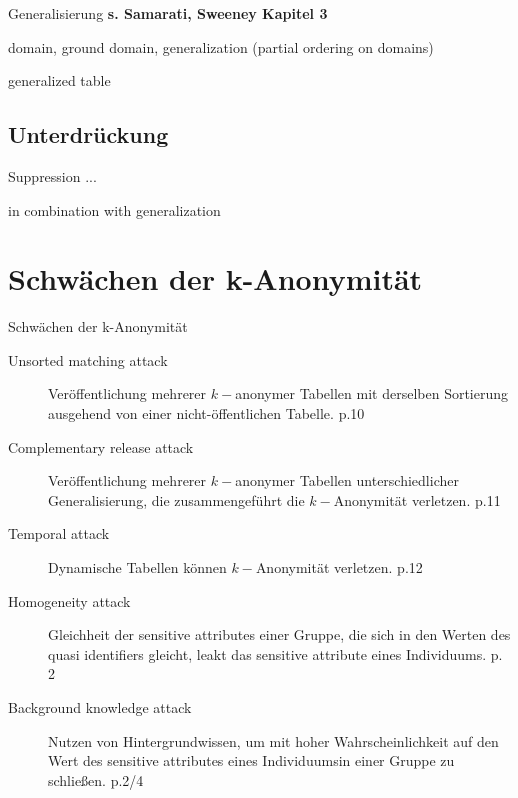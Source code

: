 \begin{frame}{Generalisierung}
	\textbf{s. Samarati, Sweeney Kapitel 3}
	
	domain, ground domain, generalization (partial ordering on domains)
	
	generalized table
\end{frame}

\subsection{Unterdrückung}

\begin{frame}{Suppression}
	...
	
	in combination with generalization
\end{frame}

\section{Schwächen der k-Anonymität}

\begin{frame}{Schwächen der k-Anonymität}

\begin{description}
	\item[Unsorted matching attack] Veröffentlichung mehrerer \(k-\)anonymer Tabellen mit derselben Sortierung ausgehend von einer nicht-öffentlichen Tabelle. \cite{sweeney_k_anonymity} p.10

	\item[Complementary release attack] Veröffentlichung mehrerer \(k-\)anonymer Tabellen unterschiedlicher Generalisierung, die zusammengeführt die \(k-\)Anonymität verletzen. \cite{sweeney_k_anonymity} p.11

	\item[Temporal attack] Dynamische Tabellen können \(k-\)Anonymität verletzen. \cite{sweeney_k_anonymity} p.12

	\item[Homogeneity attack] Gleichheit der sensitive attributes einer Gruppe, die sich in den Werten des quasi identifiers gleicht, leakt das sensitive attribute eines Individuums. \cite{machanavajjhala_l_diversity} p. 2

	\item[Background knowledge attack] Nutzen von Hintergrundwissen, um mit hoher Wahrscheinlichkeit auf den Wert des sensitive attributes eines Individuumsin einer Gruppe zu schließen. \cite{machanavajjhala_l_diversity} p.2/4
\end{description}

\end{frame}